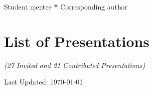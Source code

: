 \documentclass[10pt,a4paper,roman,]{moderncv} %
\begin{document}
 \begin{etaremune}[leftmargin=40pt,labelsep=10pt]

 
\end{etaremune}
\hspace*{\fill}\textbf{\dagger} Student mentee
\hspace*{\fill}\textbf{*} Corresponding author
 \begin{etaremune}[leftmargin=40pt,labelsep=10pt]
 
\end{etaremune} 

% 


% 




\section{List of Presentations}
\begin{center}
    \textit{(27 Invited and 21 Contributed Presentations)\\}
\end{center}

 
{}




\begin{center}
    Last Updated: \today
\end{center}
\end{document}
